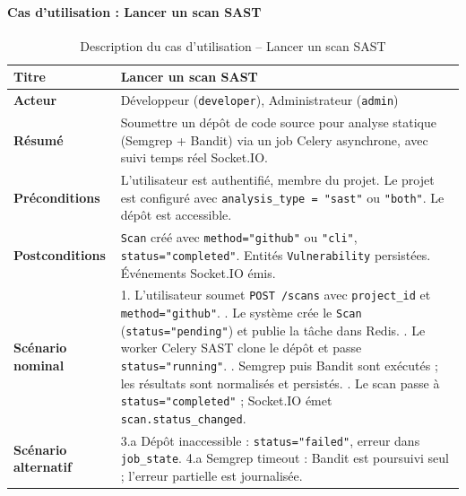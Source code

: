 \paragraph{Cas d'utilisation : Lancer un scan SAST}
\begin{table}[H]
\centering
\caption{Description du cas d'utilisation -- Lancer un scan SAST}
\label{tab:uc-sast}
\small
\renewcommand{\arraystretch}{1.3}
\begin{tabularx}{\textwidth}{>{\bfseries}p{3.5cm} X}
\hline
Titre & Lancer un scan SAST \\
\hline
Acteur & Développeur (\texttt{developer}), Administrateur (\texttt{admin}) \\
\hline
Résumé & Soumettre un dépôt de code source pour analyse statique (Semgrep + Bandit) via un job Celery asynchrone, avec suivi temps réel Socket.IO. \\
\hline
Préconditions & L'utilisateur est authentifié, membre du projet. Le projet est configuré avec \texttt{analysis\_type = "sast"} ou \texttt{"both"}. Le dépôt est accessible. \\
\hline
Postconditions & \texttt{Scan} créé avec \texttt{method="github"} ou \texttt{"cli"}, \texttt{status="completed"}. Entités \texttt{Vulnerability} persistées. Événements Socket.IO émis. \\
\hline
Scénario nominal &
1. L'utilisateur soumet \texttt{POST /scans} avec \texttt{project\_id} et \texttt{method="github"}. \newline
2. Le système crée le \texttt{Scan} (\texttt{status="pending"}) et publie la tâche dans Redis. \newline
3. Le worker Celery SAST clone le dépôt et passe \texttt{status="running"}. \newline
4. Semgrep puis Bandit sont exécutés ; les résultats sont normalisés et persistés. \newline
5. Le scan passe à \texttt{status="completed"} ; Socket.IO émet \texttt{scan.status\_changed}. \\
\hline
Scénario alternatif &
3.a Dépôt inaccessible : \texttt{status="failed"}, erreur dans \texttt{job\_state}. \newline
4.a Semgrep timeout : Bandit est poursuivi seul ; l'erreur partielle est journalisée. \\
\hline
\end{tabularx}
\end{table}

